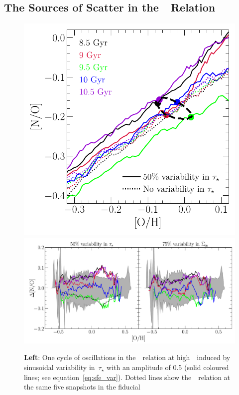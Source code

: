 \documentclass[ms.tex]{subfiles}
\begin{document}
\subsection{The Sources of Scatter in the~\ohno~Relation}
\label{sec:results:schaefer_comp}

\begin{figure}
\centering
\includegraphics[scale = 0.44]{no_oh_sfevar.pdf}
\includegraphics[scale = 0.47]{delta_no_schaefercomp.pdf}
\caption{
\textbf{Left}: One cycle of oscillations in the~\ohno~relation at
high~\oh~induced by sinusoidal variability in~$\tau_\star$ with an amplitude of
0.5 (solid coloured lines; see equation~\ref{eq:sfe_var}).
Dotted lines show the~\ohno~relation at the same five snapshots in the fiducial
}
\end{figure}
\end{document}
